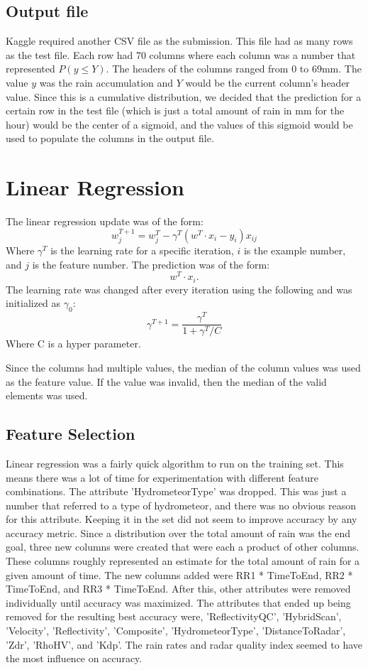 \documentclass[pdftex,a4paper,12pt]{article}
\begin{document}
\subsection{Output file}
Kaggle required another CSV file as the submission. This file had as many rows as the test file. Each row had 70 columns where each column was a number that represented $P(y \le Y)$. The headers of the columns ranged from 0 to 69mm. The value $y$ was the rain accumulation and $Y$ would be the current column's header value. Since this is a cumulative distribution, we decided that the prediction for a certain row in the test file (which is just a total amount of rain in mm for the hour) would be the center of a sigmoid, and the values of this sigmoid would be used to populate the columns in the output file.




\section{Linear Regression}
The linear regression update was of the form:
$$w^{T + 1}_j = w^{T}_j - \gamma^T(w^{T} \cdot x_{i} - y_i)x_{ij}$$
Where $\gamma^T$ is the learning rate for a specific iteration, $i$ is the example number, and $j$ is the feature number. The prediction was of the form:
$$w^{T} \cdot x_{i}.$$
The learning rate was changed after every iteration using the following and was initialized as $\gamma_0$:
$$\gamma^{T + 1} = \frac{\gamma^{T}}{1 + \gamma^{T} / C}$$
Where C is a hyper parameter.




Since the columns had multiple values, the median of the column values was used as the feature value. If the value was invalid, then the median of the valid elements was used.
\subsection{Feature Selection}
Linear regression was a fairly quick algorithm to run on the training set. This means there was a lot of time for experimentation with different feature combinations. The attribute 'HydrometeorType' was dropped. This was just a number that referred to a type of hydrometeor, and there was no obvious reason for this attribute. Keeping it in the set did not seem to improve accuracy by any accuracy metric. Since a distribution over the total amount of rain was the end goal, three new columns were created that were each a product of other columns. These columns roughly represented an estimate for the total amount of rain for a given amount of time. The new columns added were RR1 * TimeToEnd, RR2 * TimeToEnd, and RR3 * TimeToEnd. After this, other attributes were removed individually until accuracy was maximized. The attributes that ended up being removed for the resulting best accuracy were, 'ReflectivityQC', 'HybridScan', 'Velocity', 'Reflectivity', 'Composite', 'HydrometeorType', 'DistanceToRadar', 'Zdr', 'RhoHV', and 'Kdp'. The rain rates and radar quality index seemed to have the most influence on accuracy.
\end{document}
